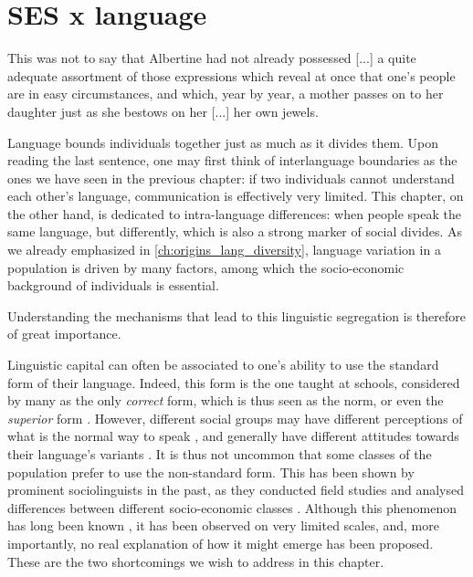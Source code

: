 \documentclass[../thesis.tex]{subfiles}
\begin{document}
\chapter{SES x language}
\label{ch:ses_ling}

\epigraph{
  This was not to say that Albertine had not already possessed [...] a quite
  adequate assortment  of those expressions which reveal at once that one's people are
  in easy circumstances, and which, year by year, a mother passes on to her daughter
  just as she bestows on her [...]
  her own jewels.
}{
}

Language bounds individuals together just as much as it divides them. Upon reading the
last sentence, one may first think of interlanguage boundaries as the ones we have seen
in the previous chapter: if two individuals cannot understand each other's language,
communication is effectively very limited. This chapter, on the other hand, is dedicated
to intra-language differences: when people speak the same language, but differently,
which is also a strong marker of social divides. As we already emphasized in
\cref{ch:origins_lang_diversity}, language variation in a population is driven by many
factors, among which the socio-economic background of individuals is essential.

Understanding the mechanisms that lead to this linguistic
segregation is therefore of great importance.

Linguistic capital can often be associated to one's ability to use the standard form of
their language. Indeed, this form is the one taught at schools, considered by many as
the only \emph{correct} form, which is thus seen as the norm, or even the
\emph{superior} form \cite{MilroyIdeologyStandard2006,DavilaInevitabilityStandard2016}.
However, different social groups may have different perceptions of what is the normal
way to speak \cite{KretzschmarLanguageVariation2010}, and generally have different
attitudes towards their language's variants \cite{GarrettLanguageAttitudes2006}. It is
thus not uncommon that some classes of the population prefer to use the non-standard
form. This has been shown by prominent sociolinguists in the past, as they conducted
field studies and analysed differences between different socio-economic classes
\cite{LabovSocialStratification1966,TrudgillSocialDifferentiation1974}. Although this
phenomenon has long been known \cite{ChambersSociolinguisticTheory2007}, it has been
observed on very limited scales, and, more importantly, no real explanation of how it
might emerge has been proposed. These are the two shortcomings we wish to address in
this chapter.
\end{document}
